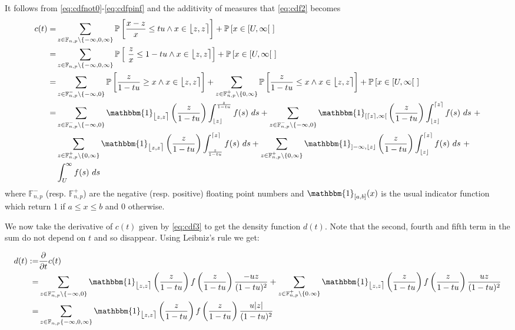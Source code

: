 \documentclass[10pt,a4paper]{article}
\theoremstyle{plain}
\theoremstyle{definition}
\newcommand{\F}[1][n,p]{\mathbb{F}_{#1}}
\newcommand{\one}{\mathbbm{1}}
\newcommand{\ceil}[1]{\lceil #1 \rceil}
\newcommand{\floor}[1]{\lfloor #1 \rfloor}
\newcommand{\fintvl}[1][x]{\mathlarger{\lfloor}#1,#1\mathlarger{\rceil}}
\newcommand{\absv}[1]{\vert #1\vert}
\newcommand{\Pro}[1]{\mathbb{P}\left[ #1 \right]}
\newcommand{\dt}{\frac{\partial}{\partial t}}
\begin{document}
It follows from \eqref{eq:cdfnot0}-\eqref{eq:cdfpinf} and the additivity of measures that \eqref{eq:cdf2} becomes
\begin{align}
c(t)=&\sum_{z\in\F\setminus\{-\infty,0,\infty\}}\Pro{\frac{x-z}{x}\leq tu\wedge x\in \fintvl[z]}+\Pro{x\in [U,\infty[~}\nonumber
\\
=&\sum_{z\in\F\setminus\{-\infty,0,\infty\}}\Pro{~\frac{z}{x}\leq 1-tu\wedge x\in \fintvl[z]}+\Pro{x\in [U,\infty[~} \nonumber
\\
=&\sum_{z\in\F^-\setminus\{-\infty,0\}}\Pro{\frac{z}{1-tu}\geq x\wedge x\in \fintvl[z]}+\sum_{z\in\F^+\setminus\{0,\infty\}}\Pro{\frac{z}{1-tu}\leq x \wedge x\in \fintvl[z]}+\Pro{x\in [U,\infty[~} \nonumber 
\\
=&\sum_{z\in\F^-\setminus\{-\infty,0\}}\one_{\fintvl[z]}\left(\frac{z}{1-tu}\right) \int^{\frac{z}{1-tu}}_{\floor{z}} f(s)~ds+ \sum_{z\in\F^-\setminus\{-\infty,0\}}\one_{[\ceil{z},\infty[}\left(\frac{z}{1-tu}\right) \int^{\ceil{z}}_{\floor{z}} f(s)~ds~+ \nonumber 
\\
&\sum_{z\in\F^+\setminus\{0,\infty\}}\one_{\fintvl[z]}\left(\frac{z}{1-tu}\right) \int^{\ceil{z}}_{\frac{z}{1-tu}} f(s)~ds+\sum_{z\in\F^+\setminus\{0,\infty\}}\one_{]-\infty,\floor{z}}\left(\frac{z}{1-tu}\right) \int_{\floor{z}}^{\ceil{z}} f(s)~ds~+
\nonumber \\
&\int_U^\infty f(s)~ds \label{eq:cdf3}
\end{align}
where $\F^-$ (resp. $\F^+$) are the negative (resp. positive) floating point numbers and $\one_{[a,b]}(x)$ is the usual indicator function which return 1 if $a\leq x\leq b$ and 0 otherwise.




We now take the derivative of $c(t)$ given by \eqref{eq:cdf3} to get the density function $d(t)$. Note that the second, fourth and fifth term in the sum do not depend on $t$ and so disappear. Using Leibniz's rule we get:

\begin{align}
d(t):=&\dt c(t)\nonumber \\
=& \sum_{z\in\F^-\setminus\{-\infty,0\}}\one_{\fintvl[z]}\left(\frac{z}{1-tu}\right) f\left(\frac{z}{1-tu}\right) \frac{-uz}{(1-tu)^2}+\sum_{z\in\F^+\setminus\{0.\infty\}}\one_{\fintvl[z]}\left(\frac{z}{1-tu}\right) f\left(\frac{z}{1-tu}\right) \frac{uz}{(1-tu)^2}\nonumber \\
=&\sum_{z\in\F\{-\infty,0,\infty\}}\one_{\fintvl[z]}\left(\frac{z}{1-tu}\right) f\left(\frac{z}{1-tu}\right) \frac{u\absv{z}}{(1-tu)^2}
\label{eq:pdf}
\end{align}
\end{document}
